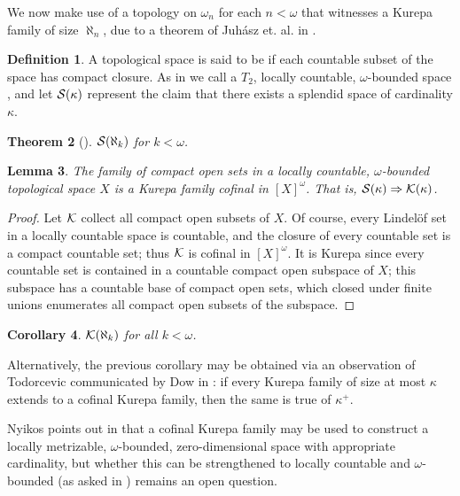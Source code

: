 \documentclass{amsart}
\theoremstyle{plain}
\newtheorem{theorem}{Theorem}
\newtheorem{lemma}[theorem]{Lemma}
\newtheorem{corollary}[theorem]{Corollary}
\theoremstyle{definition}
\newtheorem{definition}[theorem]{Definition}
\theoremstyle{remark}
\theoremstyle{plain}
\theoremstyle{definition}
\theoremstyle{remark}
\begin{document}
  We now make use of
  a topology on \(\omega_n\) for each \(n<\omega\) that
  witnesses a Kurepa family of size \(\aleph_n\), due to a theorem of
  Juh\'asz et. al. in \cite{MR539228}.

  \begin{definition}
    A topological space is said to be 
    if each countable subset of the space has compact closure.
    As in \cite{MR539228} we call a
    \(T_2\), locally countable, \(\omega\)-bounded space
    , and let \(\mathcal{S}(\kappa)\) represent
    the claim that there exists a splendid space of cardinality \(\kappa\).
  \end{definition}

  \begin{theorem}[\cite{MR539228}]
    \(\mathcal{S}(\aleph_k)\) for \(k<\omega\).
  \end{theorem}

  \begin{lemma}
    The family of compact open sets in a locally countable, \(\omega\)-bounded
    topological space \(X\)
    is a Kurepa family cofinal in \([X]^\omega\). That is,
    \(\mathcal{S}(\kappa) \Rightarrow \mathcal{K}(\kappa)\).
  \end{lemma}

  \begin{proof}
    Let \(\mathcal{K}\) collect all compact
    open subsets of \(X\). Of course, every Lindel\"of set in
    a locally countable space is countable, and the closure of every
    countable set is a compact countable set; thus \(\mathcal{K}\)
    is cofinal in \([X]^\omega\).
    It is Kurepa since every countable set is contained in a countable
    compact open subspace of \(X\); this subspace has a countable
    base of compact open sets, which closed under finite unions enumerates
    all compact open subsets of the subspace.
  \end{proof}

  \begin{corollary}
    \(\mathcal{K}(\aleph_k)\) for all \(k<\omega\).
  \end{corollary}

  Alternatively, the previous corollary may be obtained
  via an observation of Todorcevic
  communicated by Dow in \cite{MR1229125}:
  if every Kurepa family of size at most \(\kappa\)
  extends to a cofinal Kurepa family, then the same is true of \(\kappa^+\).

  Nyikos points out in \cite{NYIKOSKUREPA} that a cofinal Kurepa family may
  be used to construct a locally metrizable, \(\omega\)-bounded,
  zero-dimensional space with appropriate cardinality,
  but whether this can be
  strengthened to locally countable and \(\omega\)-bounded (as asked in
  \cite{MR539228}) remains an open question.
\end{document}
